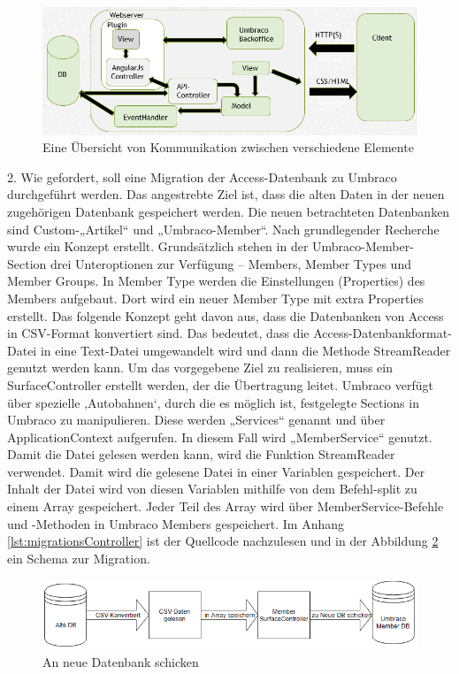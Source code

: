  \begin{figure}[h]
 	\centering
 	\includegraphics[width=1\linewidth]{Graphics/CustomSection.png}
 	\caption[Shop]{Eine Übersicht von Kommunikation zwischen verschiedene Elemente}
 	\label{fig:CustomSection}
 \end{figure}
 
2.	Wie gefordert, soll eine Migration der Access-Datenbank zu Umbraco durchgeführt werden. Das angestrebte Ziel ist, dass die alten Daten in der neuen zugehörigen Datenbank gespeichert werden. Die neuen betrachteten Datenbanken sind Custom-„Artikel“ und „Umbraco-Member“. Nach grundlegender Recherche wurde ein Konzept erstellt. Grundsätzlich stehen in der Umbraco-Member-Section \cite{OurUmbraco2018} drei Unteroptionen zur Verfügung – Members, Member Types und Member Groups. In Member Type werden die Einstellungen (Properties) des Members aufgebaut. Dort wird ein neuer Member Type mit extra Properties erstellt. Das folgende Konzept geht davon aus, dass die Datenbanken von Access in CSV-Format konvertiert sind. Das bedeutet, dass die Access-Datenbankformat-Datei in eine Text-Datei umgewandelt wird und dann die Methode StreamReader genutzt werden kann. Um das vorgegebene Ziel zu realisieren, muss ein SurfaceController erstellt werden, der die Übertragung leitet. Umbraco verfügt über spezielle ‚Autobahnen‘, durch die es möglich ist, festgelegte Sections in Umbraco zu manipulieren. Diese werden „Services“ genannt und über ApplicationContext aufgerufen. In diesem Fall wird „MemberService“ genutzt. Damit die Datei gelesen werden kann, wird die Funktion StreamReader verwendet. Damit wird die gelesene Datei in einer Variablen gespeichert. Der Inhalt der Datei wird von diesen Variablen mithilfe von dem Befehl-split zu einem Array gespeichert. Jeder Teil des Array wird über MemberService-Befehle und -Methoden in Umbraco Members gespeichert. Im Anhang \ref{lst:migrationsController} ist der Quellcode nachzulesen und in der Abbildung \ref{fig:DBMigration} ein Schema zur Migration.

 \begin{figure}[h]
	\centering
	\includegraphics[width=1\linewidth]{Graphics/DBMigration.png}
	\caption[DatenbankMigration]{An neue Datenbank schicken}
	\label{fig:DBMigration}
\end{figure}

